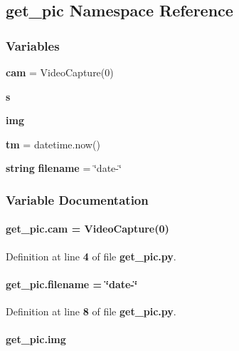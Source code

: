 \subsection{get\+\_\+pic Namespace Reference}
\label{namespaceget__pic}
\subsubsection*{Variables}
\begin{DoxyCompactItemize}
\item 
{\bf cam} = Video\+Capture(0)
\item 
{\bf s}
\item 
{\bf img}
\item 
{\bf tm} = datetime.\+now()
\item 
{\bf string} {\bf filename} = \char`\"{}date-\/\char`\"{}
\end{DoxyCompactItemize}


\subsubsection{Variable Documentation}
\paragraph[{cam}]{\setlength{\rightskip}{0pt plus 5cm}get\+\_\+pic.\+cam = Video\+Capture(0)}\label{namespaceget__pic_ae79af289cb40904eb406869a2f44ab52}


Definition at line {\bf 4} of file {\bf get\+\_\+pic.\+py}.

\paragraph[{filename}]{ get\+\_\+pic.\+filename = \char`\"{}date-\/\char`\"{}}\label{namespaceget__pic_ae200d179437c79e44afe1b3cccf16811}


Definition at line {\bf 8} of file {\bf get\+\_\+pic.\+py}.

\paragraph[{img}]{\setlength{\rightskip}{0pt plus 5cm}get\+\_\+pic.\+img}\label{namespaceget__pic_a366c1a7d966ee47d744f0d537a66d86e}


